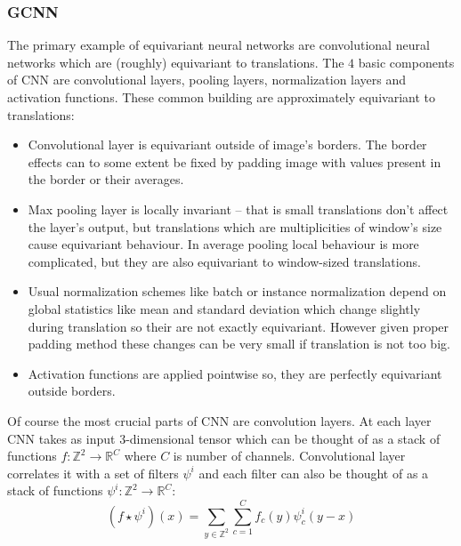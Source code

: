     \subsubsection{GCNN}
    The primary example of equivariant neural networks are convolutional neural
    networks which are (roughly) equivariant to translations. The $4$ basic
    components of CNN are convolutional layers, pooling layers, normalization
    layers and activation functions.  These common building are approximately
    equivariant to translations:
    \begin{itemize}
        \item Convolutional layer is
            equivariant outside of image's borders. The border effects can to
            some extent be fixed by padding image with values present in the
            border or their averages.
        \item Max pooling layer is locally invariant -- that is small translations don't
            affect the layer's output, but translations which are multiplicities
            of window's size cause equivariant behaviour.
            In average pooling local behaviour is more
            complicated, but they are also equivariant to window-sized
            translations.
        \item Usual normalization schemes like batch or instance
            normalization depend on global statistics
            like mean and standard deviation which change slightly during
            translation so their are not exactly equivariant. However given
            proper padding method these changes can be very small if
            translation is not too big.
        \item Activation functions are applied pointwise so, they are
            perfectly equivariant outside borders.
    \end{itemize}
    Of course the most crucial parts of CNN are convolution layers. At each
    layer CNN takes as input 3-dimensional tensor which can be thought of as a
    stack of functions $f:\mathbb{Z}^2\to\mathbb{R}^C$ where $C$ is number of channels.
    Convolutional layer correlates it with a set of filters $\psi^i$
    and each filter can also be thought of as a stack of functions
    $\psi^i:\mathbb{Z}^2\to\mathbb{R}^C$:
    \begin{equation}
        \label{eq:cnn}
        (f\star\psi^i)(x) = \sum_{y\in\mathbb{Z}^2}\sum_{c=1}^C
        f_c(y)\psi_{c}^{i}(y-x)
    \end{equation}

